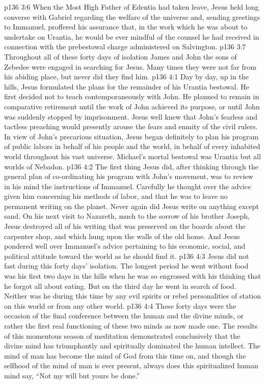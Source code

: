 \vs p136 3:6 When the Most High Father of Edentia had taken leave, Jesus held long converse with Gabriel regarding the welfare of the universe and, sending greetings to Immanuel, proffered his assurance that, in the work which he was about to undertake on Urantia, he would be ever mindful of the counsel he had received in connection with the prebestowal charge administered on Salvington.
\vs p136 3:7 \pc Throughout all of these forty days of isolation James and John the sons of Zebedee were engaged in searching for Jesus. Many times they were not far from his abiding place, but never did they find him.
\vs p136 4:1 Day by day, up in the hills, Jesus formulated the plans for the remainder of his Urantia bestowal. He first decided not to teach contemporaneously with John. He planned to remain in comparative retirement until the work of John achieved its purpose, or until John was suddenly stopped by imprisonment. Jesus well knew that John’s fearless and tactless preaching would presently arouse the fears and enmity of the civil rulers. In view of John’s precarious situation, Jesus began definitely to plan his program of public labors in behalf of his people and the world, in behalf of every inhabited world throughout his vast universe. Michael’s mortal bestowal was  Urantia but  all worlds of Nebadon.
\vs p136 4:2 The first thing Jesus did, after thinking through the general plan of co\hyp{}ordinating his program with John’s movement, was to review in his mind the instructions of Immanuel. Carefully he thought over the advice given him concerning his methods of labor, and that he was to leave no permanent writing on the planet. Never again did Jesus write on anything except sand. On his next visit to Nazareth, much to the sorrow of his brother Joseph, Jesus destroyed all of his writing that was preserved on the boards about the carpenter shop, and which hung upon the walls of the old home. And Jesus pondered well over Immanuel’s advice pertaining to his economic, social, and political attitude toward the world as he should find it.
\vs p136 4:3 \pc Jesus did not fast during this forty days’ isolation. The longest period he went without food was his first two days in the hills when he was so engrossed with his thinking that he forgot all about eating. But on the third day he went in search of food. Neither was he  during this time by any evil spirits or rebel personalities of station on this world or from any other world.
\vs p136 4:4 \pc These forty days were the occasion of the final conference between the human and the divine minds, or rather the first real functioning of these two minds as now made one. The results of this momentous season of meditation demonstrated conclusively that the divine mind has triumphantly and spiritually dominated the human intellect. The mind of man has become the mind of God from this time on, and though the selfhood of the mind of man is ever present, always does this spiritualized human mind say, \textcolor{ubdarkred}{“Not my will but yours be done.”}
